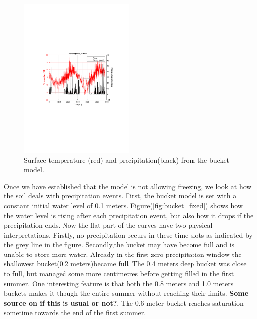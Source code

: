 \documentclass[a4paper,11pt,twocolumn]{article}
\begin{document}
\begin{figure}[h]
	\centering 
	\includegraphics[width=0.5\textwidth]{figures/precip}
	\caption{Surface temperature (red) and precipitation(black) from the bucket model.}
	\label{fig:precip}
\end{figure}

Once we have established that the model is not allowing freezing, we look at how the soil deals with precipitation events. First, the bucket model is set with a constant initial water level of 0.1 meters. Figure(\ref{fig:bucket_fixed}) shows how the water level is rising after each precipitation event, but also how it drops if the precipitation ends. Now the flat part of the curves have two physical interpretations. Firstly, no precipitation occurs in these time slots as indicated by the grey line in the figure. Secondly,the bucket may have become full and is unable to store more water. Already in the first zero-precipitation window the shallowest bucket(0.2 meters)became full. The 0.4 meters deep bucket was close to full, but managed some more centimetres before getting filled in the first summer.
One interesting feature is that both the 0.8 meters and 1.0 meters buckets makes it though the entire summer without reaching their limits. \textbf{Some source on if this is usual or not?}. The 0.6 meter bucket reaches saturation sometime towards the end of the first summer. 
\end{document}
